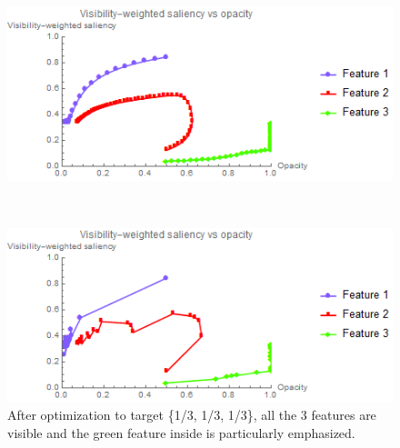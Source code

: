 \begin{figure}
	\begin{minipage}{.49\textwidth}
		\includegraphics[width=1\linewidth]{images/vortex_naive_saliencyopacity_fixed}
		\subcaption{}
	\end{minipage}~
	\begin{minipage}{.49\textwidth}
		\includegraphics[width=1\linewidth]{images/vortex_naive_saliencyopacity_parallelsearch}
		\subcaption{}
	\end{minipage}
	\caption{After optimization to target \{1/3, 1/3, 1/3\}, all the 3 features are visible and the green feature inside is particularly emphasized.}
	\label{fig:vortex_naive_optimized}
\end{figure}

